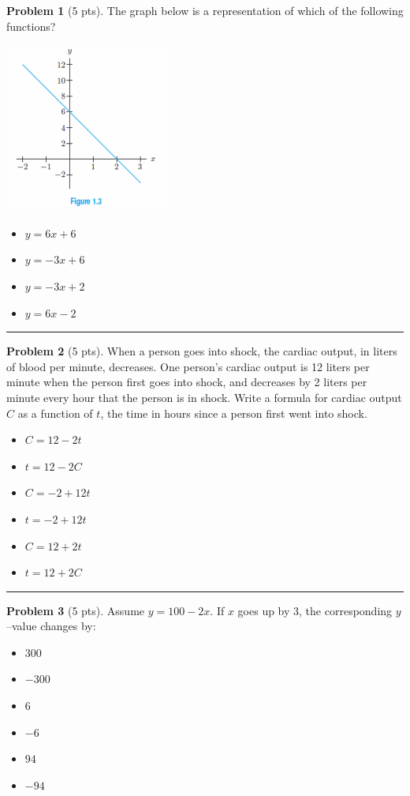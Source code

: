 \documentclass[12pt]{article}
\makeatletter
\theoremstyle{definition}
\newtheorem{problem}{Problem}
\newcommand*{\radiobutton}{%
  \@ifstar{\@radiobutton0}{\@radiobutton1}%
}
\newcommand*{\@radiobutton}[1]{%
  \begin{tikzpicture}
    \pgfmathsetlengthmacro\radius{height("X")/2}
    \draw[radius=\radius] circle;
    \ifcase#1 \fill[radius=.6*\radius] circle;\fi
  \end{tikzpicture}%
}
\makeatother
\begin{document}
\bigskip
\begin{problem}[5 pts]
The graph below is a representation of which of the following functions?
\begin{multicols}{2}
\begin{center}
\includegraphics{1graph2.png}
\end{center}
\begin{itemize}
\item[\radiobutton] $y=6x+6$
\item[\radiobutton] $y=-3x+6$
\item[\radiobutton] $y=-3x+2$
\item[\radiobutton] $y=6x-2$
\end{itemize}
\end{multicols}
\end{problem}
\hrule

\begin{problem}[5 pts]
When a person goes into shock, the cardiac output, in liters of blood per minute, decreases. One person’s cardiac output is 12 liters per minute when the person first goes into shock, and decreases by 2 liters per minute every hour that the person is in shock. Write a formula for cardiac output $C$ as a function of $t$, the time in hours since a person first went into shock.
\begin{itemize}
\item[\radiobutton] $C = 12 - 2t$
\item[\radiobutton] $t = 12 - 2C$
\item[\radiobutton] $C = -2 + 12t$
\item[\radiobutton] $t = -2 + 12t$
\item[\radiobutton] $C = 12 + 2t$
\item[\radiobutton] $t = 12 + 2C$
\end{itemize}
\end{problem}
\hrule

\begin{problem}[5 pts]
Assume $y = 100 - 2x$. If $x$ goes up by 3, the corresponding $y$--value changes by:
\begin{itemize}
\item[\radiobutton] $300$
\item[\radiobutton] $-300$
\item[\radiobutton] $6$
\item[\radiobutton] $-6$
\item[\radiobutton] $94$
\item[\radiobutton] $-94$
\end{itemize} 
\end{problem}
\end{document}
